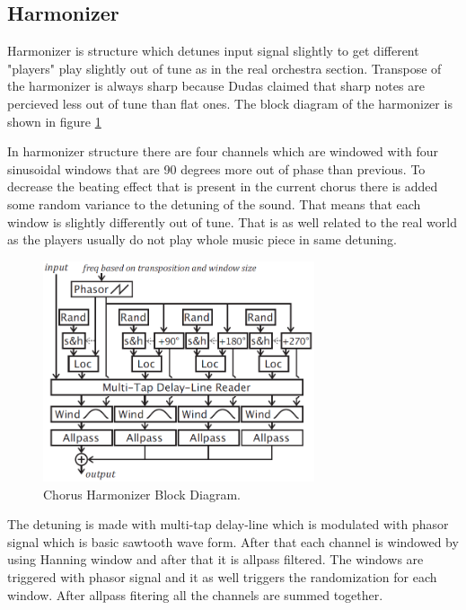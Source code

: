 \subsection{Harmonizer}

Harmonizer is structure which detunes input signal slightly to get different "players" play
slightly out of tune as in the real orchestra section. Transpose of the harmonizer is always sharp
because Dudas\cite{dudas} claimed that sharp notes are percieved less out of tune than flat ones. 
The block diagram of the harmonizer is shown in figure \ref{fig:harm}

In harmonizer structure there are four channels which are windowed with four sinusoidal windows
that are 90 degrees more out of phase than previous. To decrease the beating effect that is present
in the current chorus there is added some random variance to the detuning of the sound. That means
that each window is slightly differently out of tune. That is as well related to the real world as the players
usually do not play whole music piece in same detuning. \cite{dudas}
\begin{figure}[ht]
\centering
\includegraphics[width = 8cm]{harmonizer.png}
\caption{Chorus Harmonizer Block Diagram. \cite{dudas}}
\label{fig:harm}
\end{figure}

The detuning is made with multi-tap delay-line which is modulated with phasor signal which is basic sawtooth
wave form. After that each channel is windowed by using Hanning window and after that it is allpass filtered.
The windows are triggered with phasor signal and it as well triggers the randomization for each window.
After allpass fitering all the channels are summed together. \cite{dudas}

